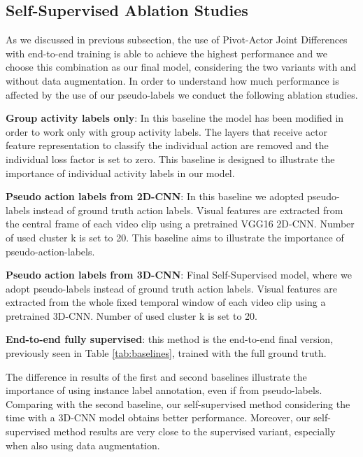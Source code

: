 \documentclass[a4paper,conference]{IEEEtran}
\begin{document}
\subsection{Self-Supervised Ablation Studies}
As we discussed in previous subsection, the use of Pivot-Actor Joint Differences with end-to-end training is able to achieve the highest performance and we choose this combination as our final model, considering the two variants with and without data augmentation. In order to understand how much performance is affected by the use of our pseudo-labels we conduct the following ablation studies.


\setcounter{elenco}{0}
\begin{list}{}{\setlength{\itemsep}{0.3cm}}
\item \textbf{ Group activity labels only}: In this baseline the model has been modified in order to work only with  group activity labels. The layers that receive actor feature representation to classify the individual action are removed and the individual loss factor  is set to zero. This baseline is designed to illustrate the importance of individual activity labels in our model.
\item \textbf{Pseudo action labels from 2D-CNN}: In this baseline we adopted pseudo-labels instead of ground truth action labels. Visual features are extracted from the central frame of each video clip using a pretrained VGG16 2D-CNN. Number of used cluster k is set to 20. This baseline aims to illustrate the importance of pseudo-action-labels.
\item \textbf{ Pseudo action labels from 3D-CNN}: Final Self-Supervised model, where we adopt pseudo-labels instead of ground truth action labels. Visual features are extracted from the whole fixed temporal window of each video clip using a pretrained 3D-CNN. Number of used cluster k is set to 20.
\item \textbf{End-to-end fully supervised}: this method is the end-to-end final version, previously seen in Table \ref{tab:baselines}, trained with the full ground truth. 
\end{list}

The difference in results of the first and second baselines illustrate the importance of using instance label annotation, even if from pseudo-labels. Comparing with the second baseline, our self-supervised method considering the time with a 3D-CNN model obtains better performance. Moreover, our self-supervised method results are very close to the supervised variant, especially when also using data augmentation.
\end{document}
